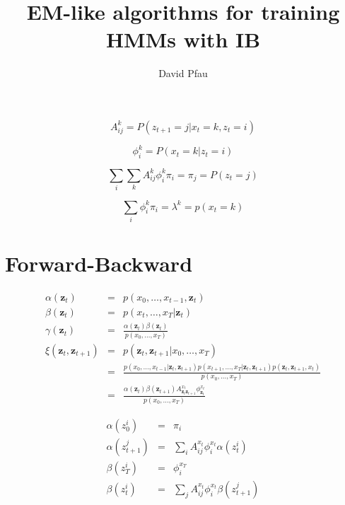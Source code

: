 \documentclass[11pt]{article}
\title{EM-like algorithms for training HMMs with IB}
\author{David Pfau}
\begin{document}
\maketitle

\[
A^{k}_{ij} = P(z_{t+1} = j | x_t = k, z_t = i)
\]

\[
\phi^k_i = P(x_t = k | z_t = i)
\]

\[
\sum_i \sum_k A^k_{ij} \phi^k_i \pi_i = \pi_j = P(z_t = j)
\]

\[
\sum_i \phi^k_i \pi_i = \lambda^k = p(x_t = k)
\]

\section{Forward-Backward}

\begin{eqnarray*}
\alpha(\mathbf{z}_t) & = & p(x_0,\ldots,x_{t-1},\mathbf{z}_t) \\
\beta(\mathbf{z}_t) & = & p(x_t,\ldots,x_T|\mathbf{z}_t) \\
\gamma(\mathbf{z}_t) & = & \frac{\alpha(\mathbf{z}_t)\beta(\mathbf{z}_t)}{p(x_0,\ldots,x_T)} \\
\xi(\mathbf{z}_t,\mathbf{z}_{t+1}) & = & p(\mathbf{z}_t,\mathbf{z}_{t+1}|x_0,\ldots,x_T) \\
& = & \frac{p(x_0,\ldots,x_{t-1}|\mathbf{z}_{t},\mathbf{z}_{t+1})p(x_{t+1},\ldots,x_T|\mathbf{z}_{t},\mathbf{z}_{t+1})p(\mathbf{z}_t,\mathbf{z}_{t+1},x_t)}{p(x_0,\ldots,x_T)} \\
& = & \frac{\alpha(\mathbf{z}_t)\beta(\mathbf{z}_{t+1})A^{x_t}_{\mathbf{z}_t\mathbf{z}_{t+1}}\phi^{x_t}_{\mathbf{z}_t}}{p(x_0,\ldots,x_T)}
\end{eqnarray*}

\begin{eqnarray*}
\alpha(z_0^i) & = & \pi_i \\
\alpha(z_{t+1}^j) & = & \sum_i A^{x_t}_{ij}\phi^{x_t}_i\alpha(z_t^i) \\
\beta(z_T^i) & = & \phi^{x_T}_i \\
\beta(z_t^i) & = & \sum_j A^{x_t}_{ij}\phi^{x_t}_i \beta(z_{t+1}^j)
\end{eqnarray*}
\end{document}
